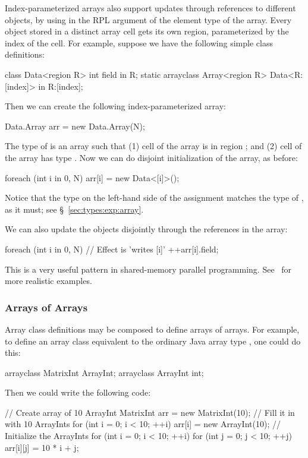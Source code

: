 Index-parameterized arrays also support updates through references to
different objects, by using \kwd{[index]} in the RPL argument of the
element type of the array.  Every object stored in a distinct array
cell gets its own region, parameterized by the index of the cell.  For
example, suppose we have the following simple class definitions:
%
\begin{dpjlisting}
class Data<region R> {
    int field in R;
    static arrayclass Array<region R> {
        Data<R:[index]> in R:[index];
    }
}
\end{dpjlisting}
%
Then we can create the following index-parameterized array:
%
\begin{dpjlisting}
Data.Array arr = new Data.Array(N);
\end{dpjlisting}
%
The type of  is an array such that (1) cell  of the
array is in region \kwd{[i]}; and (2) cell  of the array has
type .  Now we can do disjoint initialization of the
array, as before:
%
\begin{dpjlisting}
foreach (int i in 0, N)
    arr[i] = new Data<[i]>();
\end{dpjlisting}
%
Notice that the type  on the left-hand side of the
assignment matches the type of , as it must; see
\S~\ref{sec:types:exp:array}.

We can also update the objects disjointly through the references in
the array:
%
\begin{dpjlisting}
foreach (int i in 0, N)
    // Effect is 'writes [i]'
    ++arr[i].field;
\end{dpjlisting}
%
This is a very useful pattern in shared-memory parallel programming.
See \tutorial\ for more realistic examples.


\subsubsection{Arrays of Arrays}

Array class definitions may be composed to define arrays of arrays.
For example, to define an array class equivalent to the ordinary Java
array type , one could do this:
%
\begin{dpjlisting}
arrayclass MatrixInt {
    ArrayInt;
}
arrayclass ArrayInt {
    int;
}
\end{dpjlisting}
%
Then we could write the following code:
%
\begin{dpjlisting}
// Create array of 10 ArrayInt
MatrixInt arr = new MatrixInt(10);
// Fill it in with 10 ArrayInts
for (int i = 0; i < 10; ++i)
    arr[i] = new ArrayInt(10);
// Initialize the ArrayInts
for (int i = 0; i < 10; ++i)
    for (int j = 0; j < 10; ++j)
        arr[i][j] = 10 * i + j;
\end{dpjlisting}

